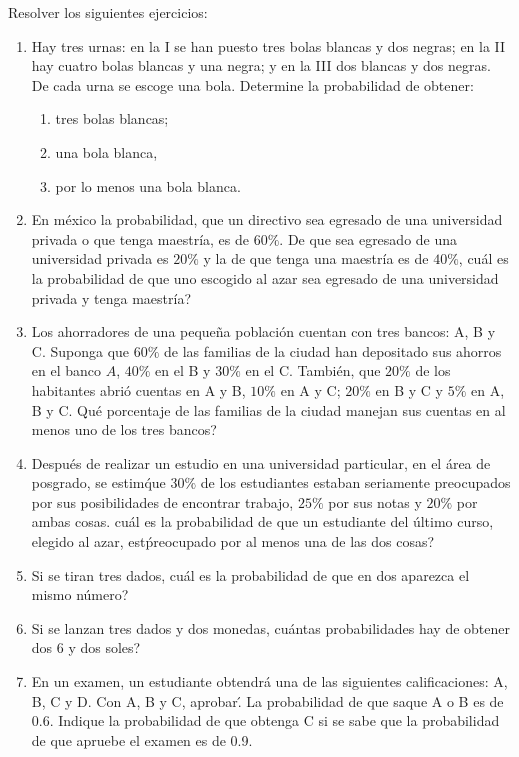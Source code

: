 \begin{Ejer} Resolver los siguientes ejercicios: 
\begin{enumerate}
\item Hay tres urnas: en la I se han puesto tres bolas blancas y dos negras; en la II hay cuatro bolas blancas y una negra; y en la III dos blancas y dos negras. De cada urna se escoge una bola. Determine la probabilidad de obtener:
\begin{enumerate}
\item tres bolas blancas;
\item una bola blanca,
\item por lo menos una bola blanca.
\end{enumerate}

\item En m\'exico la probabilidad, que un directivo sea egresado de una universidad privada o que tenga maestr\'ia, es de $60\%$. De que sea egresado de una universidad privada es $20\%$ y la de que tenga una maestr\'ia es de $40\%$,  cu\'al es la probabilidad de que uno escogido al azar sea egresado de una universidad privada y tenga maestr\'ia?

\item Los ahorradores de una peque\~na poblaci\'on cuentan con tres bancos: A, B y C. Suponga que $60\%$ de las familias de la ciudad han depositado sus ahorros en el banco $A$, $40\%$ en el B y $30\%$ en el C. Tambi\'en, que $20\%$  de los habitantes abri\'o cuentas en A y B, $10\%$  en A y C; $20\%$  en B y C y $5\%$ en A, B y C.  Qu\'e porcentaje de las familias de la ciudad manejan sus cuentas en al menos uno de los tres bancos?

\item Despu\'es de realizar un estudio en una universidad particular, en el \'area de posgrado, se estim\' que $30\%$  de los estudiantes estaban seriamente preocupados por sus posibilidades de encontrar trabajo, $25\%$  por sus notas y $20\%$ por ambas cosas.  cu\'al es la probabilidad de que un estudiante del \'ultimo curso, elegido al azar, est\' preocupado por al menos una de las dos cosas?

\item Si se tiran tres dados,  cu\'al es la probabilidad de que en dos aparezca el mismo n\'umero?

\item Si se lanzan tres dados y dos monedas,  cu\'antas probabilidades hay de obtener dos 6 y dos soles?

\item En un examen, un estudiante obtendr\'a una de las siguientes calificaciones: A, B, C y D. Con A, B y C, aprobar\'. La probabilidad de que saque A o B es de 0.6. Indique la probabilidad de que obtenga C si se sabe que la probabilidad de que apruebe el examen es de 0.9.


\end{enumerate}
\end{Ejer}
